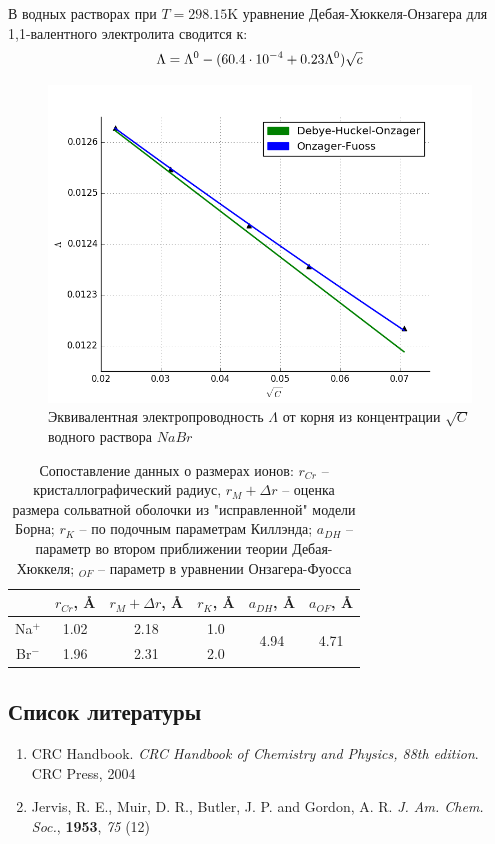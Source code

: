 \documentclass[13pt]{extarticle}
\begin{document}
В водных растворах при $T = 298.15$K уравнение Дебая-Хюккеля-Онзагера для 1,1-валентного электролита сводится к:
\begin{gather}
	\Lambda = \Lambda^0 - ( 60.4 \cdot 10^{-4} + 0.23 \Lambda^0 ) \sqrt{c} \notag
\end{gather}

\begin{figure}[!ht]
\centering
\includegraphics[scale = 0.6]{../pictures/ofu.png}
\caption{Эквивалентная электропроводность $\Lambda$ от корня из концентрации $\sqrt{C}$ водного раствора $NaBr$}
\end{figure}

\begin{table}
\centering
\begin{tabular}{|c|c|c|c|c|c|}
	\hline
	& $r_{Cr}$, \AA & $r_M + \Delta r$, \AA & $r_K$, \AA & $a_{DH}$, \AA & $a_{OF}$, \AA \\
	\hline
	Na$^{+}$ & 1.02 & 2.18 & 1.0 & \multirow{2}{*}{4.94} & \multirow{2}{*}{4.71} \\
	Br$^{-}$ & 1.96 & 2.31 & 2.0 & & \\
	\hline
\end{tabular}
\caption{Сопоставление данных о размерах ионов: $r_{Cr}$ -- кристаллографический радиус, $r_M + \Delta r$ -- оценка размера сольватной оболочки из "исправленной" модели Борна; $r_K$ -- по подочным параметрам Киллэнда; $a_{DH}$ -- параметр во втором приближении теории Дебая-Хюккеля; $_{OF}$ -- параметр в уравнении Онзагера-Фуосса}
\end{table}

\subsection*{Список литературы}
\begin{enumerate}
	\item CRC Handbook. \textit{CRC Handbook of Chemistry and Physics, 88th edition}. CRC Press, 2004
	\item Jervis, R. E., Muir, D. R., Butler, J. P. and Gordon, A. R. \textit{J. Am. Chem. Soc.}, \textbf{1953}, \textit{75} (12)
\end{enumerate}
\end{document}
